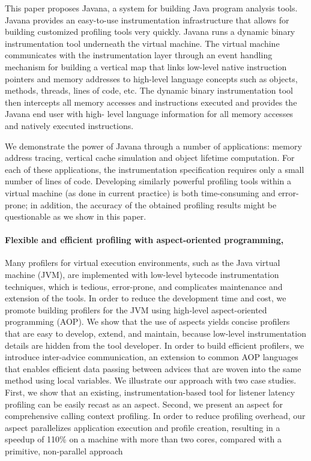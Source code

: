 This paper proposes Javana, a system for building Java program analysis tools.
Javana provides an easy-to-use instrumentation infrastructure that allows
for building customized profiling tools very quickly.
Javana runs a dynamic binary instrumentation tool underneath
the virtual machine. The virtual machine communicates with the
instrumentation layer through an event handling mechanism for
building a vertical map that links low-level native instruction pointers and memory addresses to high-level language concepts such as
objects, methods, threads, lines of code, etc.
The dynamic binary instrumentation tool then intercepts all memory accesses and instructions executed and provides the Javana end user with high-
level language information for all memory accesses and natively
executed instructions.

We demonstrate the power of Javana through a number of applications: memory address tracing, vertical cache simulation and
object lifetime computation.
For each of these applications, the instrumentation specification requires only a small number of lines
of code.
Developing similarly powerful profiling tools within a virtual machine (as done in current practice) is both time-consuming
and error-prone; in addition, the accuracy of the obtained profiling
results might be questionable as we show in this paper.
\paragraph{Flexible and efficient profiling with aspect-oriented programming, \cite{Binder:2006:FEM:1173706.1173733}}
Many profilers for virtual execution environments, such as the Java virtual machine (JVM), are implemented with low-level bytecode instrumentation techniques, which is tedious, error-prone, and complicates maintenance and extension of the tools.
In order to reduce the development time and cost, we promote building profilers for the JVM using high-level aspect-oriented programming (AOP).
We show that the use of aspects yields concise profilers that are easy to develop, extend, and maintain, because low-level
instrumentation details are hidden from the tool developer.
In order to build efficient profilers, we introduce inter-advice communication, an extension to common AOP languages that enables efficient data passing
between advices that are woven into the same method using local variables.
We illustrate our approach with two case studies.
First, we show that an existing, instrumentation-based tool for listener latency
profiling can be easily recast as an aspect.
Second, we present an aspect for comprehensive calling context profiling.
In order to reduce profiling overhead, our aspect parallelizes application execution and profile
creation, resulting in a speedup of 110\% on a machine with more than two cores, compared with a primitive, non-parallel approach
